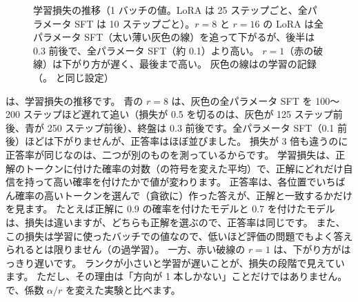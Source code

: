 \begin{figure}[tbp]
\centering
{}
\caption{学習損失の推移（1 バッチの値。LoRA は 25 ステップごと、全パラメータ SFT は 10 ステップごと）。$r=8$ と $r=16$ の LoRA は全パラメータ SFT（太い薄い灰色の線）を追って下がるが、後半は 0.3 前後で、全パラメータ SFT（約 0.1）より高い。
$r=1$（赤の破線）は下がり方が遅く、最後まで高い。
灰色の線はの学習の記録（。 と同じ設定）}
\label{fig:lora-curves}
\end{figure}

は、学習損失の推移です。
青の $r=8$ は、灰色の全パラメータ SFT を 100〜200 ステップほど遅れて追い（損失が 0.5 を切るのは、灰色が 125 ステップ前後、青が 250 ステップ前後）、終盤は 0.3 前後です。全パラメータ SFT（0.1 前後）ほどは下がりませんが、正答率はほぼ並びました。
損失が 3 倍も違うのに正答率が同じなのは、二つが別のものを測っているからです。
学習損失は、正解のトークンに付けた確率の対数（の符号を変えた平均）で、正解にどれだけ自信を持って高い確率を付けたかで値が変わります。
正答率は、各位置でいちばん確率の高いトークンを選んで（貪欲に）作った答えが、正解と一致するかだけを見ます。
たとえば正解に 0.9 の確率を付けたモデルと 0.7 を付けたモデルは、損失は違いますが、どちらも正解を選ぶので、正答率は同じです。
また、この損失は学習に使ったバッチでの値なので、低いほど評価の問題でもよく答えられるとは限りません（の過学習）。
一方、赤い破線の $r=1$ は、下がり方がはっきり遅いです。
ランクが小さいと学習が遅いことが、損失の段階で見えています。
ただし、その理由は「方向が 1 本しかない」ことだけではありません。で、係数 $\alpha/r$ を変えた実験と比べます。

